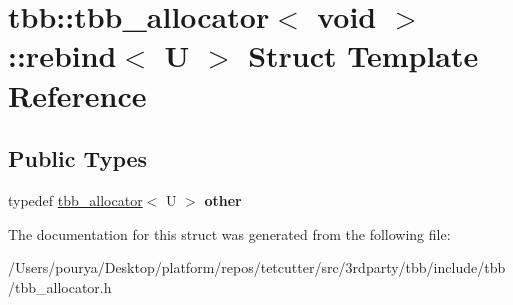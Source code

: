 \hypertarget{structtbb_1_1tbb__allocator_3_01void_01_4_1_1rebind}{}\section{tbb\+:\+:tbb\+\_\+allocator$<$ void $>$\+:\+:rebind$<$ U $>$ Struct Template Reference}
\label{structtbb_1_1tbb__allocator_3_01void_01_4_1_1rebind}
\subsection*{Public Types}
\begin{DoxyCompactItemize}
\item 
\hypertarget{structtbb_1_1tbb__allocator_3_01void_01_4_1_1rebind_a8f3c27dc0f43be2eafdfe8c6f222c44c}{}typedef \hyperlink{classtbb_1_1tbb__allocator}{tbb\+\_\+allocator}$<$ U $>$ {\bfseries other}\label{structtbb_1_1tbb__allocator_3_01void_01_4_1_1rebind_a8f3c27dc0f43be2eafdfe8c6f222c44c}

\end{DoxyCompactItemize}


The documentation for this struct was generated from the following file\+:\begin{DoxyCompactItemize}
\item 
/\+Users/pourya/\+Desktop/platform/repos/tetcutter/src/3rdparty/tbb/include/tbb/tbb\+\_\+allocator.\+h\end{DoxyCompactItemize}

